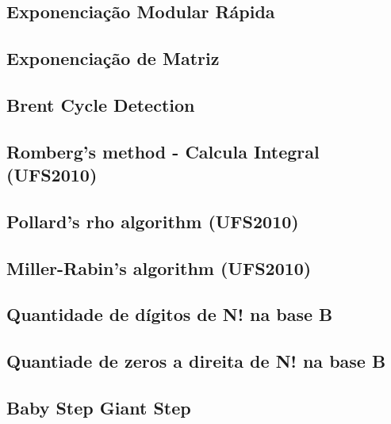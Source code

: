 \subsection{Exponenciação Modular Rápida}
\raggedbottom
\hrulefill
\subsection{Exponenciação de Matriz}
\raggedbottom
\hrulefill
\subsection{Brent	Cycle Detection}
\raggedbottom
\hrulefill
\subsection{Romberg's method - Calcula Integral (UFS2010)}
\raggedbottom
\hrulefill
\subsection{Pollard's rho algorithm (UFS2010)}
\raggedbottom
\hrulefill
\subsection{Miller-Rabin's algorithm (UFS2010)}
\raggedbottom
\hrulefill
\subsection{Quantidade de dígitos de N! na base B}
\raggedbottom
\hrulefill
\subsection{Quantiade de zeros a direita de N! na base B}
\raggedbottom
\hrulefill
\subsection{Baby Step Giant Step}
\raggedbottom
\hrulefill
